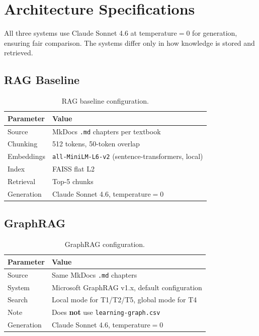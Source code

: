 \section{Architecture Specifications}\label{sec:architecture}

All three systems use Claude Sonnet 4.6 at temperature$=$0 for generation,
ensuring fair comparison. The systems differ only in how knowledge is stored
and retrieved.

\subsection{RAG Baseline}\label{sec:arch-rag}

\begin{table}[htbp]
\centering
\caption{RAG baseline configuration.}
\label{tab:rag-config}
\begin{tabular}{ll}
\toprule
\textbf{Parameter} & \textbf{Value} \\
\midrule
Source & MkDocs \texttt{.md} chapters per textbook \\
Chunking & 512 tokens, 50-token overlap \\
Embeddings & \texttt{all-MiniLM-L6-v2} (sentence-transformers, local) \\
Index & FAISS flat L2 \\
Retrieval & Top-5 chunks \\
Generation & Claude Sonnet 4.6, temperature$=$0 \\
\bottomrule
\end{tabular}
\end{table}

\subsection{GraphRAG}\label{sec:arch-graphrag}

\begin{table}[htbp]
\centering
\caption{GraphRAG configuration.}
\label{tab:graphrag-config}
\begin{tabular}{ll}
\toprule
\textbf{Parameter} & \textbf{Value} \\
\midrule
Source & Same MkDocs \texttt{.md} chapters \\
System & Microsoft GraphRAG v1.x, default configuration \\
Search & Local mode for T1/T2/T5, global mode for T4 \\
Note & Does \textbf{not} use \texttt{learning-graph.csv} \\
Generation & Claude Sonnet 4.6, temperature$=$0 \\
\bottomrule
\end{tabular}
\end{table}


